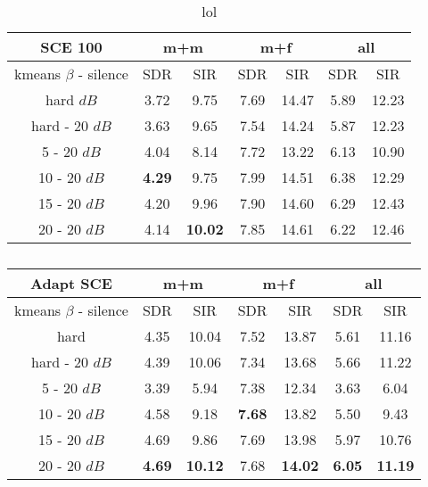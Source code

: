 \documentclass[master,final,11pt]{iscs-thesis}
\begin{document}
\begin{table}[h]
\centering
\begin{tabular}{c|c|c|c|c|c|c}
SCE 100 & \multicolumn{2}{c|}{m+m} & \multicolumn{2}{c|}{m+f} & \multicolumn{2}{c}{all} \\ 
\hline 
kmeans $\beta$ - silence & SDR & SIR & SDR & SIR & SDR & SIR \\ 
\hline 
hard $dB$ & 3.72 & 9.75 & 7.69 & 14.47 & 5.89 & 12.23 \\ 
hard - 20 $dB$ & 3.63 & 9.65 & 7.54 & 14.24 & 5.87 & 12.23 \\ 
\hline 
\hline 
5 - 20 $dB$ & 4.04 & 8.14 & 7.72 & 13.22 & 6.13 & 10.90 \\ 
10 - 20 $dB$ & \cellcolor{green}\textbf{4.29} & \cellcolor{green}9.75 & \cellcolor{green}7.99 & \cellcolor{green}14.51 & 6.38 & 12.29 \\ 
15 - 20 $dB$ & 4.20 & 9.96 & 7.90 & 14.60 & 6.29 & 12.43 \\ 
20 - 20 $dB$ & 4.14 & \textbf{10.02} & 7.85 & 14.61 & 6.22 & 12.46 \\ 
\end{tabular}
\captionsetup{justification=centering}
\caption{lol}
\label{table:SCE100softkmeans}
\end{table}


\begin{table}[h]
\centering
\begin{tabular}{c|c|c|c|c|c|c}
Adapt SCE & \multicolumn{2}{c|}{m+m} & \multicolumn{2}{c|}{m+f} & \multicolumn{2}{c}{all} \\ 
\hline 
kmeans $\beta$ - silence & SDR & SIR & SDR & SIR & SDR & SIR \\ 
\hline
hard   & 4.35 & 10.04 & 7.52 & 13.87 & 5.61 & 11.16 \\ 
hard - 20 $dB$  & 4.39 & 10.06 & 7.34 & 13.68 & 5.66 & 11.22 \\
\hline
\hline
5 - 20 $dB$  & 3.39 & 5.94 & 7.38 & 12.34 & 3.63 & 6.04 \\ 
10 - 20 $dB$  & 4.58 & 9.18 & \cellcolor{green}\textbf{7.68} & \cellcolor{green}13.82 & 5.50 & 9.43 \\ 
15 - 20 $dB$ & 4.69 & 9.86 & 7.69 & 13.98 & 5.97 & 10.76 \\ 
20 - 20 $dB$ & \cellcolor{green}\textbf{4.69} & \cellcolor{green}\textbf{10.12} & 7.68 & \textbf{14.02} & \cellcolor{green}\textbf{6.05} & \cellcolor{green}\textbf{11.19} \\ 
\end{tabular}
\captionsetup{justification=centering}
\caption{}
\label{table:AdaptSCE100}
\end{table}
\end{document}
